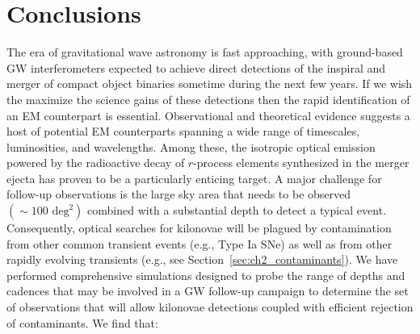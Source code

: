 \section{Conclusions}
\label{sec:ch2_conc}
The era of gravitational wave astronomy is fast approaching, with ground-based GW interferometers expected to achieve direct detections of the inspiral and merger of compact object binaries sometime during the next few years. If we wish the maximize the science gains of these detections then the rapid identification of an EM counterpart is essential.  Observational and theoretical evidence suggests a host of potential EM counterparts spanning a wide range of timescales, luminosities, and wavelengths. Among these, the isotropic optical emission powered by the radioactive decay of $r$-process elements synthesized in the merger ejecta has proven to be a particularly enticing target. A major challenge for follow-up observations is the large sky area that needs to be observed $(\sim100\text{ deg}^2)$ combined with a substantial depth to detect a typical event. Consequently, optical searches for kilonovae will be plagued by contamination from other common transient events (e.g., Type Ia SNe) as well as from other rapidly evolving transients (e.g., see Section~\ref{sec:ch2_contaminants}). We have performed comprehensive simulations designed to probe the range of depths and cadences that may be involved in a GW follow-up campaign to determine the set of observations that will allow kilonovae detections coupled with efficient rejection of contaminants. We find that:

